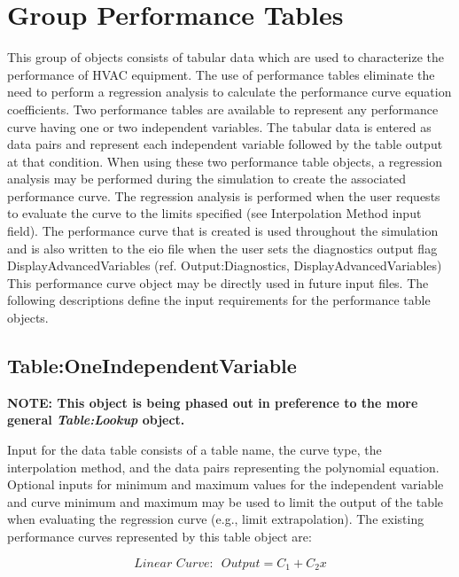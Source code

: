 \section{Group Performance Tables}\label{group-performance-tables}

This group of objects consists of tabular data which are used to characterize the performance of HVAC equipment. The use of performance tables eliminate the need to perform a regression analysis to calculate the performance curve equation coefficients. Two performance tables are available to represent any performance curve having one or two independent variables. The tabular data is entered as data pairs and represent each independent variable followed by the table output at that condition. When using these two performance table objects, a regression analysis may be performed during the simulation to create the associated performance curve. The regression analysis is performed when the user requests to evaluate the curve to the limits specified (see Interpolation Method input field). The performance curve that is created is used throughout the simulation and is also written to the eio file when the user sets the diagnostics output flag DisplayAdvancedVariables (ref. Output:Diagnostics, DisplayAdvancedVariables) This performance curve object may be directly used in future input files. The following descriptions define the input requirements for the performance table objects.

\subsection{Table:OneIndependentVariable}\label{tableoneindependentvariable}

\textbf{NOTE: This object is being phased out in preference to the more general \emph{Table:Lookup} object.}

Input for the data table consists of a table name, the curve type, the interpolation method, and the data pairs representing the polynomial equation. Optional inputs for minimum and maximum values for the independent variable and curve minimum and maximum may be used to limit the output of the table when evaluating the regression curve (e.g., limit extrapolation). The existing performance curves represented by this table object are:

\begin{equation}
Linear\,\,Curve:\,\,\,Output = {C_1} + {C_2}x
\end{equation}

